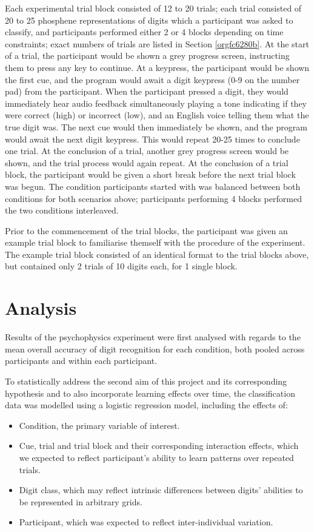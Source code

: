 \documentclass[a4paper,11pt,openany]{book}
\begin{document}
Each experimental trial block consisted of 12 to 20 trials; each trial consisted of 20 to 25 phosphene representations of digits which a participant was asked to classify, and participants performed either 2 or 4 blocks depending on time constraints; exact numbers of trials are listed in Section \ref{orgfc6280b}.
At the start of a trial, the participant would be shown a grey progress screen, instructing them to press any key to continue.
At a keypress, the participant would be shown the first cue, and the program would await a digit keypress (0-9 on the number pad) from the participant.
When the participant pressed a digit, they would immediately hear audio feedback simultaneously playing a tone indicating if they were correct (high) or incorrect (low), and an English voice telling them what the true digit was.
The next cue would then immediately be shown, and the program would await the next digit keypress.
This would repeat 20-25 times to conclude one trial.
At the conclusion of a trial, another grey progress screen would be shown, and the trial process would again repeat.
At the conclusion of a trial block, the participant would be given a short break before the next trial block was begun.
The condition participants started with was balanced between both conditions for both scenarios above; participants performing 4 blocks performed the two conditions interleaved.

Prior to the commencement of the trial blocks, the participant was given an example trial block to familiarise themself with the procedure of the experiment.
The example trial block consisted of an identical format to the trial blocks above, but contained only 2 trials of 10 digits each, for 1 single block.

\section*{Analysis}
\label{sec:orgd7fc323}

Results of the psychophysics experiment were first analysed with regards to the mean overall accuracy of digit recognition for each condition, both pooled across participants and within each participant.

To statistically address the second aim of this project and its corresponding hypothesis and to also incorporate learning effects over time, the classification data was modelled using a logistic regression model, including the effects of:
\begin{itemize}
\item Condition, the primary variable of interest.
\item Cue, trial and trial block and their corresponding interaction effects, which we expected to reflect participant's ability to learn patterns over repeated trials.
\item Digit class, which may reflect intrinsic differences between digits' abilities to be represented in arbitrary grids.
\item Participant, which was expected to reflect inter-individual variation.
\end{itemize}
\end{document}
